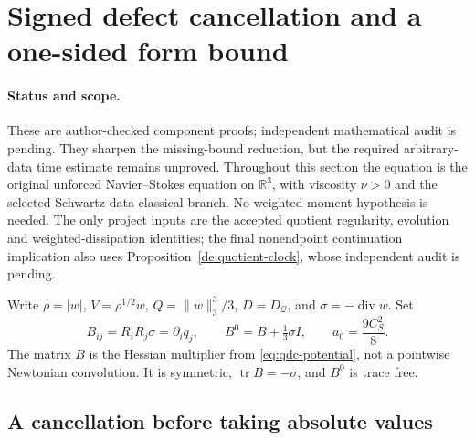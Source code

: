 \section{Signed defect cancellation and a one-sided form bound}
\label{sd:section}

\paragraph{Status and scope.}
These are author-checked component proofs; independent mathematical audit
is pending.  They sharpen the missing-bound reduction, but the required
arbitrary-data time estimate remains unproved.  Throughout this section the
equation is the original unforced Navier--Stokes equation on $\mathbb R^3$,
with viscosity $\nu>0$ and the selected Schwartz-data classical branch.
No weighted moment hypothesis is needed.  The only project inputs are the
accepted quotient regularity, evolution and weighted-dissipation identities;
the final nonendpoint continuation implication also uses
Proposition~\ref{de:quotient-clock}, whose independent audit is pending.

Write $\rho=|w|$, $V=\rho^{1/2}w$, $Q=\|w\|_3^3/3$,
$D=D_{\mathcal Q}$, and $\sigma=-\operatorname{div}w$. Set
\[
 B_{ij}=R_iR_j\sigma=\partial_iq_j,\qquad
 B^0=B+\tfrac13\sigma I,\qquad
 a_0=\frac{9C_S^2}{8}.
\]
The matrix $B$ is the Hessian multiplier from
\eqref{eq:qdc-potential}, not a pointwise Newtonian convolution.  It is
symmetric, $\operatorname{tr}B=-\sigma$, and $B^0$ is trace free.

\subsection{A cancellation before taking absolute values}

